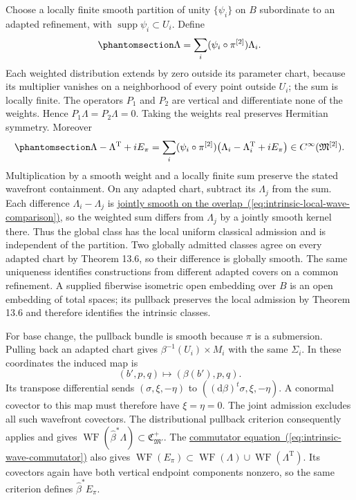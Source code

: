 \documentclass[
  english,
  11pt,
  reqno]{amsart}
\newcounter{none} %
\begin{document}
Choose a locally finite smooth partition of unity \(\{\psi_i\}\) on
\(B\) subordinate to an adapted refinement, with
\(\operatorname{supp}\psi_i\subset U_i\). Define
\begin{equation}\protect\phantomsection\label{eq:intrinsic-wave-partition}{
\Lambda=\sum_i(\psi_i\circ\pi^{[2]})\Lambda_i.
}\end{equation} Each weighted distribution extends by zero outside its
parameter chart, because its multiplier vanishes on a neighborhood of
every point outside \(U_i\); the sum is locally finite. The operators
\(P_1\) and \(P_2\) are vertical and differentiate none of the weights.
Hence \(P_1\Lambda=P_2\Lambda=0\). Taking the weights real preserves
Hermitian symmetry. Moreover
\begin{equation}\protect\phantomsection\label{eq:intrinsic-wave-commutator}{
\Lambda-\Lambda^{\mathrm T}+iE_\pi
=\sum_i(\psi_i\circ\pi^{[2]})
\bigl(\Lambda_i-\Lambda_i^{\mathrm T}+iE_\pi\bigr)
\in C^\infty(\mathfrak M^{[2]}).
}\end{equation} Multiplication by a smooth weight and a locally finite
sum preserve the stated wavefront containment. On any adapted chart,
subtract its \(\Lambda_j\) from the sum. Each difference
\(\Lambda_i-\Lambda_j\) is
\hyperref[eq:intrinsic-local-wave-comparison]{jointly smooth on the
overlap~(\ref*{eq:intrinsic-local-wave-comparison})}, so the weighted sum differs from \(\Lambda_j\) by a jointly
smooth kernel there. Thus the global class has the local uniform
classical admission and is independent of the partition. Two globally
admitted classes agree on every adapted chart by Theorem 13.6, so their
difference is globally smooth. The same uniqueness identifies
constructions from different adapted covers on a common refinement. A
supplied fiberwise isometric open embedding over \(B\) is an open
embedding of total spaces; its pullback preserves the local admission by
Theorem 13.6 and therefore identifies the intrinsic classes.

For base change, the pullback bundle is smooth because \(\pi\) is a
submersion. Pulling back an adapted chart gives
\(\beta^{-1}(U_i)\times M_i\) with the same \(\Sigma_i\). In these
coordinates the induced map is \[
(b',p,q)\longmapsto(\beta(b'),p,q).
\] Its transpose differential sends \((\sigma,\xi,-\eta)\) to
\(((\mathrm d\beta)^t\sigma,\xi,-\eta)\). A conormal covector to this
map must therefore have \(\xi=\eta=0\). The joint admission excludes all
such wavefront covectors. The distributional pullback criterion
consequently applies and gives
\(\operatorname{WF}(\widehat\beta^{*}\Lambda)\subset\mathfrak C^+_{\mathfrak M'}\).
The \hyperref[eq:intrinsic-wave-commutator]{commutator equation~(\ref*{eq:intrinsic-wave-commutator})} also
gives
\(\operatorname{WF}(E_\pi)\subset\operatorname{WF}(\Lambda)\cup\operatorname{WF}(\Lambda^{\mathrm T})\).
Its covectors again have both vertical endpoint components nonzero, so
the same criterion defines \(\widehat\beta^{*}E_\pi\).
\end{document}
